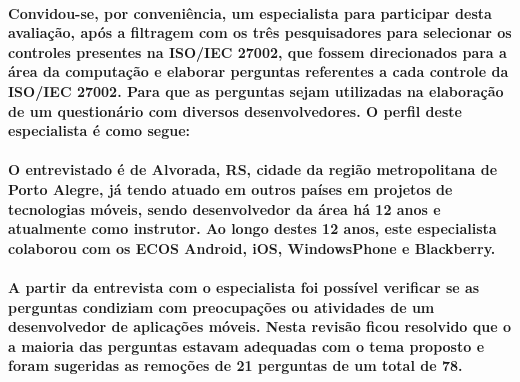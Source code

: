     \paragraph{
    Convidou-se, por conveniência, um especialista para participar desta avaliação, após a filtragem com os três pesquisadores para selecionar os controles presentes na ISO/IEC 27002, que fossem direcionados para a área da computação e elaborar perguntas referentes a cada controle da ISO/IEC 27002. Para que as perguntas sejam utilizadas na elaboração de um questionário com diversos desenvolvedores. O perfil deste especialista é como segue:}   
    
    \paragraph{
    O entrevistado é de Alvorada, RS, cidade da região metropolitana de Porto Alegre, já tendo atuado em outros países em projetos de tecnologias móveis, sendo desenvolvedor da área há 12 anos e atualmente como instrutor. Ao longo destes 12 anos, este especialista colaborou com os ECOS Android, iOS, WindowsPhone e Blackberry.
    }
    
    \paragraph{
    A partir da entrevista com o especialista foi possível verificar se as perguntas condiziam com preocupações ou atividades de um desenvolvedor de aplicações móveis. Nesta revisão ficou resolvido que o a maioria das perguntas estavam adequadas com o tema proposto e foram sugeridas as remoções de 21 perguntas de um total de 78.}
    
    
 

 
 

 

 
 
 
